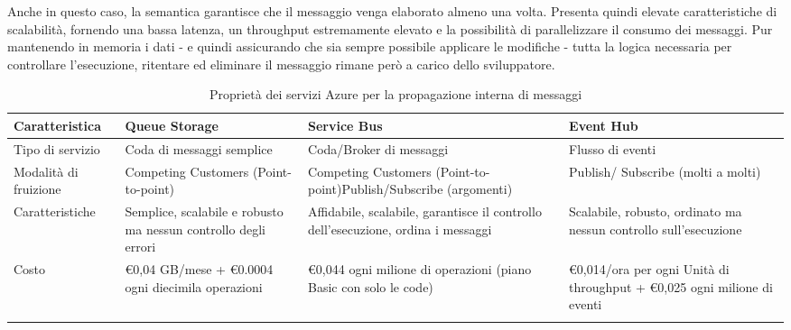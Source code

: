 Anche in questo caso, la semantica garantisce che il messaggio venga elaborato almeno una volta.
\clearpage
Presenta quindi elevate caratteristiche di scalabilità,
fornendo una bassa latenza, un throughput estremamente elevato
e la possibilità di parallelizzare il consumo dei messaggi.
Pur mantenendo in memoria i dati
- e quindi assicurando che sia sempre possibile applicare le modifiche -
tutta la logica necessaria per controllare l'esecuzione, ritentare ed eliminare il messaggio
rimane però a carico dello sviluppatore.\\
\begin{longtable}{|P{2.9cm}|P{3.9cm}|P{3.9cm}|P{3.9cm}|}
    \hline
    \textbf{Caratteristica} & \textbf{Queue Storage}                                         & \textbf{Service Bus}                                                              & \textbf{Event Hub}                                                      \\
    \hline
    Tipo di servizio        & Coda di messaggi semplice                                      & Coda/Broker di messaggi                                                           & Flusso di eventi                                                        \\
    \hline
    Modalità di fruizione   & Competing Customers (Point-to-point)                           & Competing Customers (Point-to-point)\newline Publish/Subscribe (argomenti)        & Publish/ Subscribe (molti a molti)                                      \\
    \hline
    Caratteristiche         & Semplice, scalabile e robusto ma nessun controllo degli errori & Affidabile, scalabile, garantisce il controllo dell'esecuzione, ordina i messaggi & Scalabile, robusto, ordinato ma nessun controllo sull'esecuzione        \\
    \hline
    Costo                   & €0,04 GB/mese + €0.0004 ogni diecimila operazioni              & €0,044 ogni milione di operazioni (piano Basic con solo le code)                  & €0,014/ora per ogni Unità di throughput + €0,025 ogni milione di eventi \\
    \hline
    \caption{Proprietà dei servizi Azure per la propagazione interna di messaggi }
\end{longtable}


